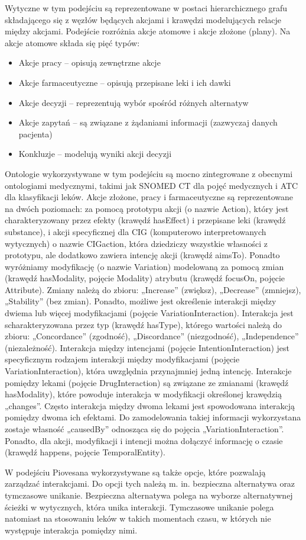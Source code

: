 Wytyczne w tym podejściu są reprezentowane w postaci hierarchicznego grafu składającego się z węzłów będących akcjami i krawędzi modelujących relacje między akcjami.\cite{Piovesan} Podejście rozróżnia akcje atomowe i akcje złożone (plany). Na akcje atomowe składa się pięć typów:
\begin{itemize}
\item{Akcje pracy – opisują zewnętrzne akcje}
\item{Akcje farmaceutyczne – opisują przepisane leki i ich dawki}
\item{Akcje decyzji – reprezentują wybór spośród różnych alternatyw}
\item{Akcje zapytań – są związane z żądaniami informacji (zazwyczaj danych pacjenta)}
\item{Konkluzje – modelują wyniki akcji decyzji}
\end{itemize}
Ontologie wykorzystywane w tym podejściu są mocno zintegrowane z obecnymi ontologiami medycznymi, takimi jak SNOMED CT dla pojęć medycznych i ATC dla klasyfikacji leków. Akcje złożone, pracy i farmaceutyczne są reprezentowane na dwóch poziomach: za pomocą prototypu akcji (o nazwie Action), który jest charakteryzowany przez efekty (krawędź hasEffect) i przepisane leki (krawędź substance), i akcji specyficznej dla CIG (komputerowo interpretowanych wytycznych) o nazwie CIGaction, która dziedziczy wszystkie własności z prototypu, ale dodatkowo zawiera intencję akcji (krawędź aimsTo). Ponadto wyróżniamy modyfikację (o nazwie Variation) modelowaną za pomocą zmian (krawędź hasModality, pojęcie Modality) atrybutu (krawędź focusOn, pojęcie Attribute). Zmiany należą do zbioru: „Increase” (zwiększ), „Decrease” (zmniejsz), „Stability” (bez zmian). Ponadto, możliwe jest określenie interakcji między dwiema lub więcej modyfikacjami (pojęcie VariationInteraction). Interakcja jest scharakteryzowana przez typ (krawędź hasType), którego wartości należą do zbioru: „Concordance” (zgodność), „Discordance” (niezgodność), „Independence” (niezależność). Interakcja między intencjami (pojęcie IntentionInteraction) jest specyficznym rodzajem interakcji między modyfikacjami (pojęcie VariationInteraction), która uwzględnia przynajmniej jedną intencję. Interakcje pomiędzy lekami (pojęcie DrugInteraction) są związane ze zmianami (krawędź hasModality), które powoduje interakcja w modyfikacji określonej krawędzią „changes”. Często interakcja między dwoma lekami jest spowodowana interakcją pomiędzy dwoma ich efektami. Do zamodelowania takiej informacji wykorzystana zostaje własność „causedBy” odnosząca się do pojęcia „VariationInteraction”. Ponadto, dla akcji, modyfikacji i intencji można dołączyć informację o czasie (krawędź happens, pojęcie TemporalEntity).

W podejściu Piovesana wykorzystywane są także opcje, które pozwalają zarządzać interakcjami. Do opcji tych należą m. in. bezpieczna alternatywa oraz tymczasowe unikanie. Bezpieczna alternatywa polega na wyborze alternatywnej ścieżki w wytycznych, która unika interakcji. Tymczasowe unikanie polega natomiast na stosowaniu leków w takich momentach czasu, w których nie występuje interakcja pomiędzy nimi.

